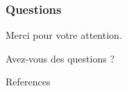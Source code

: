 \documentclass{beamer}
\theoremstyle{remark}
\theoremstyle{plain}
\begin{document}
\begin{frame}
  \frametitle{Questions}
  \begin{center}
    Merci pour votre attention.

    Avez-vous des questions ?
  \end{center}
\end{frame}

\setcounter{lastframe}{\insertframenumber}

\begin{frame}[allowframebreaks]{References}


\end{frame}

\setcounter{framenumber}{\thelastframe}
\end{document}
